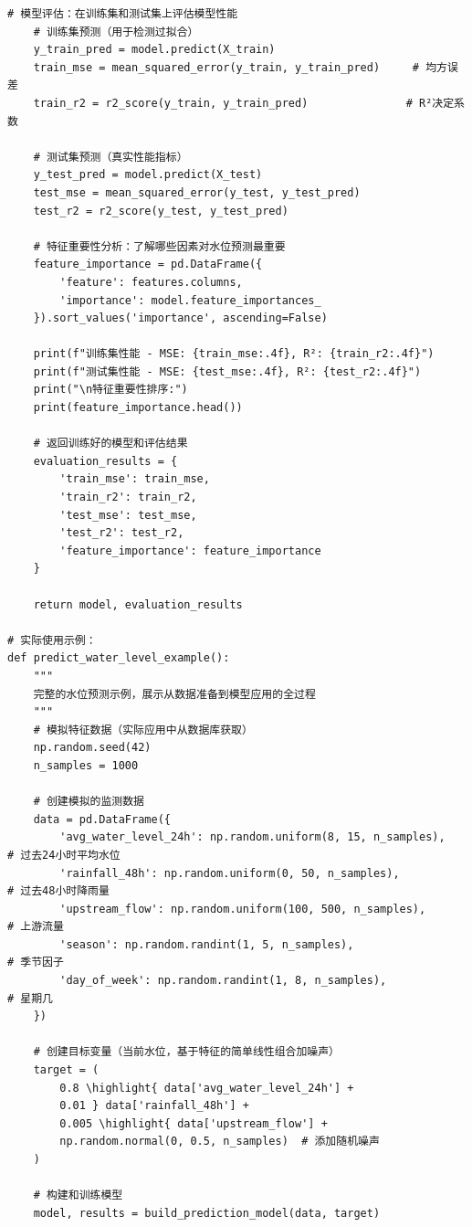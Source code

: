 \begin{lstlisting}[style=python]
    # 模型评估：在训练集和测试集上评估模型性能
    # 训练集预测（用于检测过拟合）
    y_train_pred = model.predict(X_train)
    train_mse = mean_squared_error(y_train, y_train_pred)     # 均方误差
    train_r2 = r2_score(y_train, y_train_pred)               # R²决定系数
    
    # 测试集预测（真实性能指标）
    y_test_pred = model.predict(X_test)
    test_mse = mean_squared_error(y_test, y_test_pred)
    test_r2 = r2_score(y_test, y_test_pred)
    
    # 特征重要性分析：了解哪些因素对水位预测最重要
    feature_importance = pd.DataFrame({
        'feature': features.columns,
        'importance': model.feature_importances_
    }).sort_values('importance', ascending=False)
    
    print(f"训练集性能 - MSE: {train_mse:.4f}, R²: {train_r2:.4f}")
    print(f"测试集性能 - MSE: {test_mse:.4f}, R²: {test_r2:.4f}")
    print("\n特征重要性排序:")
    print(feature_importance.head())
    
    # 返回训练好的模型和评估结果
    evaluation_results = {
        'train_mse': train_mse,
        'train_r2': train_r2,
        'test_mse': test_mse,
        'test_r2': test_r2,
        'feature_importance': feature_importance
    }
    
    return model, evaluation_results

# 实际使用示例：
def predict_water_level_example():
    """
    完整的水位预测示例，展示从数据准备到模型应用的全过程
    """
    # 模拟特征数据（实际应用中从数据库获取）
    np.random.seed(42)
    n_samples = 1000
    
    # 创建模拟的监测数据
    data = pd.DataFrame({
        'avg_water_level_24h': np.random.uniform(8, 15, n_samples),    # 过去24小时平均水位
        'rainfall_48h': np.random.uniform(0, 50, n_samples),           # 过去48小时降雨量
        'upstream_flow': np.random.uniform(100, 500, n_samples),       # 上游流量
        'season': np.random.randint(1, 5, n_samples),                  # 季节因子
        'day_of_week': np.random.randint(1, 8, n_samples),            # 星期几
    })
    
    # 创建目标变量（当前水位，基于特征的简单线性组合加噪声）
    target = (
        0.8 \highlight{ data['avg_water_level_24h'] + 
        0.01 } data['rainfall_48h'] +
        0.005 \highlight{ data['upstream_flow'] +
        np.random.normal(0, 0.5, n_samples)  # 添加随机噪声
    )
    
    # 构建和训练模型
    model, results = build_prediction_model(data, target)
    

\end{lstlisting}
